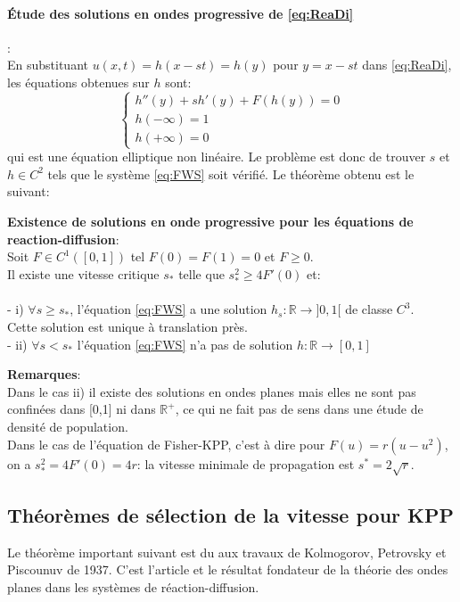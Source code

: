 \paragraph{Étude des solutions en ondes progressive de \eqref{eq:ReaDi}}:\\
En substituant $u(x,t) = h(x-st) = h(y)$ pour $y=x-st$ dans \eqref{eq:ReaDi}, les équations obtenues sur $h$ sont: \begin{equation} \label{eq:FWS} \left\{
                \begin{array}{ll}
                h''(y)+ sh'(y)+F(h(y))=0 \\
                h(-\infty)= 1 \\  h(+\infty) =0 
                   \end{array}
              \right.
\end{equation} 
qui est une équation elliptique non linéaire. Le problème est donc de trouver $s$ et $h \in C^2$ tels que le système \eqref{eq:FWS} soit vérifié. Le théorème obtenu est le suivant:



\begin{theorem}{\textbf{Existence de solutions en onde progressive pour les équations de reaction-diffusion}}:\\
Soit $F \in C^1([0,1])$ tel $F(0)=F(1)=0$ et $F\geq 0$. \\
Il existe une vitesse critique $s_*$ telle que $s_*^2 \geq 4F'(0)$ et: \\ \\
- i) $\forall s \geq s_*$, l'équation \eqref{eq:FWS} a une solution $h_s:\mathbb{R} \rightarrow ]0,1[$ de classe $C^3$.\\ Cette solution est unique à translation près. \\
- ii)  $\forall s<s_*$ l'équation \eqref{eq:FWS} n'a pas de solution $h:\mathbb{R} \rightarrow [0,1]$
\end{theorem}
\textbf{Remarques}:\\
 Dans le cas ii) il existe des solutions en ondes planes mais elles ne sont pas confinées dans [0,1] ni dans $\mathbb{R}^+$, ce qui ne fait pas de sens dans une étude de densité de population.\\
 Dans le cas de l'équation de Fisher-KPP, c'est à dire pour $F(u)=r(u - u^2)$, on a $s_*^2 = 4F'(0) = 4r $: la vitesse minimale de propagation est $s^* =2\sqrt r $.


\subsection{Théorèmes de sélection de la vitesse pour KPP}
Le théorème important suivant est du aux travaux de Kolmogorov, Petrovsky et Piscounuv de 1937. C'est l'article et le résultat fondateur de la théorie des ondes planes dans les systèmes de réaction-diffusion. %

